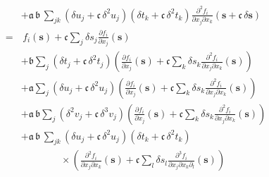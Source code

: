 \begin{align*}
\\
&+ 
\mathfrak{a} \, \mathfrak{b} \, \sum_{jk} 
\left( \delta u_{j} + \mathfrak{c} \, \delta^{2} u_{j} \right) 
\left( \delta t_{k} + \mathfrak{c} \, \delta^{2} t_{k} \right)
\frac{ \partial^{2} f_{i} }{ \partial x_{j} \partial x_{k} } \! \left( \mathbf{s} + \mathfrak{c} \, \delta \mathbf{s} \right)
\\
%
=& \,
f_{i} \! \left( \mathbf{s} \right) + \mathfrak{c} \sum_{j} \delta s_{j} 
\frac{ \partial f_{i} }{ \partial x_{j} } \! \left( \mathbf{s} \right)
\\
&+ 
\mathfrak{b}
\sum_{j} \left( \delta t_{j} + \mathfrak{c} \, \delta^{2} t_{j} \right) 
\left( \frac{ \partial f_{i} }{ \partial x_{j} } \! \left( \mathbf{s} \right) 
+  \mathfrak{c} \sum_{k} \delta s_{k} 
\frac{ \partial^{2} f_{i} }{ \partial x_{j} \partial x_{k} } \! \left( \mathbf{s} \right) \right)
\\
&+ 
\mathfrak{a} \sum_{j}
\left( \delta u_{j} + \mathfrak{c} \, \delta^{2} u_{j} \right) 
\left( \frac{ \partial f_{i} }{ \partial x_{j} } \! \left( \mathbf{s} \right) 
+ \mathfrak{c} \sum_{k} \delta s_{k} 
\frac{ \partial^{2} f_{i} }{ \partial x_{j} \partial x_{k} } \! \left( \mathbf{s} \right) \right)
\\
& + \mathfrak{a} \, \mathfrak{b} \sum_{j}
\left( \delta^{2} v_{j} + \mathfrak{c} \, \delta^{3} v_{j} \right) 
\left( \frac{ \partial f_{i} }{ \partial x_{j} } \! \left( \mathbf{s} \right) 
+ \mathfrak{c} \sum_{k} \delta s_{k} 
\frac{ \partial^{2} f_{i} }{ \partial x_{j} \partial x_{k} } \! \left( \mathbf{s} \right) \right)
\\
&+ 
\mathfrak{a} \, \mathfrak{b} \, \sum_{jk} 
\left( \delta u_{j} + \mathfrak{c} \, \delta^{2} u_{j} \right) 
\left( \delta t_{k} + \mathfrak{c} \, \delta^{2} t_{k} \right)
\\
& \quad\quad\quad\quad \times \left(
\frac{ \partial^{2} f_{i} }{ \partial x_{j} \partial x_{k} } \! \left( \mathbf{s} \right) 
+ \mathfrak{c} \sum_{l} \delta s_{l} 
\frac{ \partial^{3} f_{i} }{ \partial x_{j} \partial x_{k} \partial_{l} } \! \left( \mathbf{s} \right)
\right)
\\
%
\end{align*}

